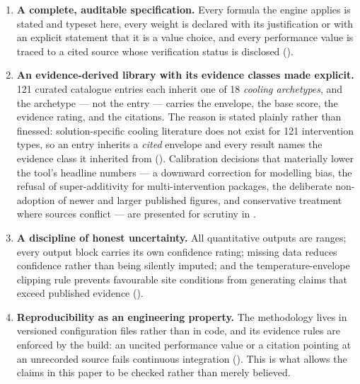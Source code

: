 \begin{enumerate}
  \item \textbf{A complete, auditable specification.} Every formula the engine
  applies is stated and typeset here, every weight is declared with its
  justification or with an explicit statement that it is a value choice, and
  every performance value is traced to a cited source whose verification
  status is disclosed ().

  \item \textbf{An evidence-derived library with its evidence classes made
  explicit.} \num{121} curated catalogue entries each inherit one of \num{18}
  \emph{cooling archetypes}, and the archetype --- not the entry --- carries
  the envelope, the base score, the evidence rating, and the citations. The
  reason is stated plainly rather than finessed: solution-specific cooling
  literature does not exist for \num{121} intervention types, so an entry
  inherits a \emph{cited} envelope and every result names the evidence class it
  inherited from (). Calibration decisions that materially
  lower the tool's headline numbers --- a downward correction for modelling
  bias, the refusal of super-additivity for multi-intervention packages, the
  deliberate non-adoption of newer and larger published figures, and
  conservative treatment where sources conflict --- are presented for scrutiny
  in .

  \item \textbf{A discipline of honest uncertainty.} All quantitative outputs
  are ranges; every output block carries its own confidence rating; missing
  data reduces confidence rather than being silently imputed; and the
  temperature-envelope clipping rule prevents favourable site conditions from
  generating claims that exceed published evidence ().

  \item \textbf{Reproducibility as an engineering property.} The methodology
  lives in versioned configuration files rather than in code, and its evidence
  rules are enforced by the build: an uncited performance value or a citation
  pointing at an unrecorded source fails continuous integration
  (). This is what allows the claims in this paper to
  be checked rather than merely believed.
\end{enumerate}

